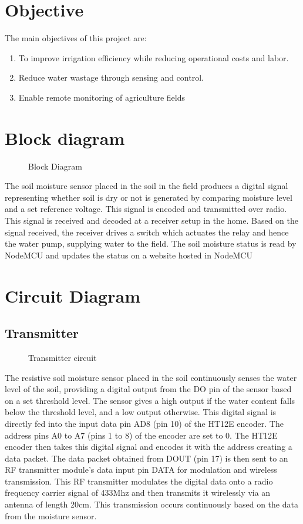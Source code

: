 \documentclass[12pt, a4paper]{report}
\newcommand{\addsvg}[2]{}
\begin{document}
\newpage
\chapter{Objective}
\noindent
The main objectives of this project are:
\begin{enumerate}
  \item To improve irrigation efficiency while reducing operational
    costs and labor.
  \item Reduce water wastage through sensing and control.
  \item Enable remote monitoring of agriculture fields
\end{enumerate}

\newpage
\chapter{Block diagram}

\begin{figure}[ht]
	\centering
	\addsvg{images/block}{.9\linewidth}
	\caption{Block Diagram}
  \end{figure}

The soil moisture sensor placed in the soil in the field produces a
digital signal representing whether soil is dry or not is generated
by comparing moisture level and a set reference voltage. This signal
is encoded and transmitted over radio. This signal is received and
decoded at a receiver setup in the home. Based on the signal
received, the receiver drives a switch which actuates the relay and
hence the water pump, supplying water to the field. The soil moisture
status is read by NodeMCU and updates the status on a website hosted in NodeMCU

\newpage
\chapter{Circuit Diagram}

\section{Transmitter}
\begin{figure}[ht]
  \centering
  \addsvg{images/tx}{.7\linewidth}
  \caption{Transmitter circuit}
\end{figure}
The resistive soil moisture sensor placed in the soil continuously
senses the water level of the soil, providing a digital output from
the DO pin of the sensor based on a set threshold level. The sensor
gives a high output if the water content falls below the threshold
level, and a low output otherwise. This digital signal is directly
fed into the input data pin AD8 (pin 10) of the HT12E encoder. The
address pins A0 to A7 (pins 1 to 8) of the encoder are set to 0. The
HT12E encoder then takes this digital signal and encodes it with the
address creating a data packet. The data packet obtained from DOUT
(pin 17) is then sent to an RF transmitter module’s data input pin
DATA for modulation and wireless transmission. This RF transmitter
modulates the digital data onto a radio frequency carrier signal of
433Mhz and then transmits it wirelessly via an antenna of length
20cm. This transmission occurs continuously based on the data from
the moisture sensor.
\end{document}

